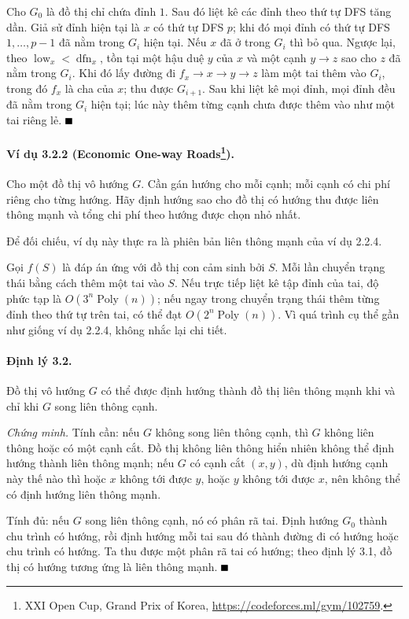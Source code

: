\documentclass[11pt]{article}
\renewcommand{\leadsto}{\mathrel{\longrightarrow}}
\providecommand{\square}{\mathord{\vcenter{\hrule height .6em width .6em}}}
\begin{document}
Cho $G_0$ là đồ thị chỉ chứa đỉnh $1$. Sau đó liệt kê các đỉnh theo thứ tự DFS
tăng dần. Giả sử đỉnh hiện tại là $x$ có thứ tự DFS $p$; khi đó mọi đỉnh có thứ
tự DFS $1,\ldots,p-1$ đã nằm trong $G_i$ hiện tại. Nếu $x$ đã ở trong $G_i$ thì
bỏ qua. Ngược lại, theo $\operatorname{low}_x<\operatorname{dfn}_x$, tồn tại một
hậu duệ $y$ của $x$ và một cạnh $y\to z$ sao cho $z$ đã nằm trong $G_i$. Khi đó
lấy đường đi $f_x\to x\leadsto y\to z$ làm một tai thêm vào $G_i$, trong đó
$f_x$ là cha của $x$; thu được $G_{i+1}$. Sau khi liệt kê mọi đỉnh, mọi đỉnh đều
đã nằm trong $G_i$ hiện tại; lúc này thêm từng cạnh chưa được thêm vào như một
tai riêng lẻ. \hfill$\square$

\paragraph{Ví dụ 3.2.2 (Economic One-way Roads\protect\footnote{XXI Open Cup, Grand Prix of Korea, \url{https://codeforces.ml/gym/102759}.}).}
Cho một đồ thị vô hướng $G$. Cần gán hướng cho mỗi cạnh; mỗi cạnh có chi phí
riêng cho từng hướng. Hãy định hướng sao cho đồ thị có hướng thu được liên thông
mạnh và tổng chi phí theo hướng được chọn nhỏ nhất.

Để đối chiếu, ví dụ này thực ra là phiên bản liên thông mạnh của ví dụ 2.2.4.

Gọi $f(S)$ là đáp án ứng với đồ thị con cảm sinh bởi $S$. Mỗi lần chuyển trạng
thái bằng cách thêm một tai vào $S$. Nếu trực tiếp liệt kê tập đỉnh của tai, độ
phức tạp là $O(3^n\operatorname{Poly}(n))$; nếu ngay trong chuyển trạng thái
thêm từng đỉnh theo thứ tự trên tai, có thể đạt
$O(2^n\operatorname{Poly}(n))$. Vì quá trình cụ thể gần như giống ví dụ 2.2.4,
không nhắc lại chi tiết.

\paragraph{Định lý 3.2.}
Đồ thị vô hướng $G$ có thể được định hướng thành đồ thị liên thông mạnh khi và
chỉ khi $G$ song liên thông cạnh.

\emph{Chứng minh.}
Tính cần: nếu $G$ không song liên thông cạnh, thì $G$ không liên thông hoặc có
một cạnh cắt. Đồ thị không liên thông hiển nhiên không thể định hướng thành liên
thông mạnh; nếu $G$ có cạnh cắt $(x,y)$, dù định hướng cạnh này thế nào thì hoặc
$x$ không tới được $y$, hoặc $y$ không tới được $x$, nên không thể có định hướng
liên thông mạnh.

Tính đủ: nếu $G$ song liên thông cạnh, nó có phân rã tai. Định hướng $G_0$ thành
chu trình có hướng, rồi định hướng mỗi tai sau đó thành đường đi có hướng hoặc
chu trình có hướng. Ta thu được một phân rã tai có hướng; theo định lý 3.1, đồ
thị có hướng tương ứng là liên thông mạnh. \hfill$\square$
\end{document}
